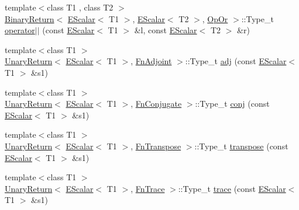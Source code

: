 \begin{DoxyCompactItemize}
\item 
{\footnotesize template$<$class T1 , class T2 $>$ }\\\mbox{\hyperlink{structENSEM_1_1BinaryReturn}{Binary\+Return}}$<$ \mbox{\hyperlink{classENSEM_1_1EScalar}{E\+Scalar}}$<$ T1 $>$, \mbox{\hyperlink{classENSEM_1_1EScalar}{E\+Scalar}}$<$ T2 $>$, \mbox{\hyperlink{structENSEM_1_1OpOr}{Op\+Or}} $>$\+::Type\+\_\+t \mbox{\hyperlink{group__escalar_gadede5cc3683f39a01170f32e3f759c8e}{operator$\vert$$\vert$}} (const \mbox{\hyperlink{classENSEM_1_1EScalar}{E\+Scalar}}$<$ T1 $>$ \&l, const \mbox{\hyperlink{classENSEM_1_1EScalar}{E\+Scalar}}$<$ T2 $>$ \&r)
\item 
{\footnotesize template$<$class T1 $>$ }\\\mbox{\hyperlink{structENSEM_1_1UnaryReturn}{Unary\+Return}}$<$ \mbox{\hyperlink{classENSEM_1_1EScalar}{E\+Scalar}}$<$ T1 $>$, \mbox{\hyperlink{structENSEM_1_1FnAdjoint}{Fn\+Adjoint}} $>$\+::Type\+\_\+t \mbox{\hyperlink{group__escalar_ga51071562edd203962f48e4b44f0c0a0c}{adj}} (const \mbox{\hyperlink{classENSEM_1_1EScalar}{E\+Scalar}}$<$ T1 $>$ \&s1)
\item 
{\footnotesize template$<$class T1 $>$ }\\\mbox{\hyperlink{structENSEM_1_1UnaryReturn}{Unary\+Return}}$<$ \mbox{\hyperlink{classENSEM_1_1EScalar}{E\+Scalar}}$<$ T1 $>$, \mbox{\hyperlink{structENSEM_1_1FnConjugate}{Fn\+Conjugate}} $>$\+::Type\+\_\+t \mbox{\hyperlink{group__escalar_ga291c7e9b7f872b3e6db0d75ff3421b6a}{conj}} (const \mbox{\hyperlink{classENSEM_1_1EScalar}{E\+Scalar}}$<$ T1 $>$ \&s1)
\item 
{\footnotesize template$<$class T1 $>$ }\\\mbox{\hyperlink{structENSEM_1_1UnaryReturn}{Unary\+Return}}$<$ \mbox{\hyperlink{classENSEM_1_1EScalar}{E\+Scalar}}$<$ T1 $>$, \mbox{\hyperlink{structENSEM_1_1FnTranspose}{Fn\+Transpose}} $>$\+::Type\+\_\+t \mbox{\hyperlink{group__escalar_ga5b02d7d8a00b851a2452fb03861a9401}{transpose}} (const \mbox{\hyperlink{classENSEM_1_1EScalar}{E\+Scalar}}$<$ T1 $>$ \&s1)
\item 
{\footnotesize template$<$class T1 $>$ }\\\mbox{\hyperlink{structENSEM_1_1UnaryReturn}{Unary\+Return}}$<$ \mbox{\hyperlink{classENSEM_1_1EScalar}{E\+Scalar}}$<$ T1 $>$, \mbox{\hyperlink{structENSEM_1_1FnTrace}{Fn\+Trace}} $>$\+::Type\+\_\+t \mbox{\hyperlink{group__escalar_ga4c3bf5ecccbf7b690868af26ec7d8ca6}{trace}} (const \mbox{\hyperlink{classENSEM_1_1EScalar}{E\+Scalar}}$<$ T1 $>$ \&s1)
\item 

\end{DoxyCompactItemize}
